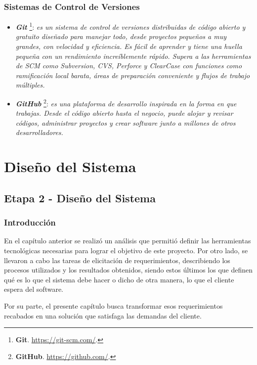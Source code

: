 \documentclass[11pt,oneside]{book}
\begin{document}
\subsection{Sistemas de Control de Versiones}
\begin{itemize}
\item \textit{\textbf{Git}} \footnote{\textbf{Git}. \url{https://git-scm.com/}.}: \textit{es un sistema de control de versiones distribuidas de código abierto y gratuito diseñado para manejar todo, desde proyectos pequeños a muy grandes, con velocidad y eficiencia. Es fácil de aprender y tiene una huella pequeña con un rendimiento increíblemente rápido. Supera a las herramientas de SCM como Subversion, CVS, Perforce y ClearCase con funciones como ramificación local barata, áreas de preparación conveniente y flujos de trabajo múltiples.}

\item \textit{\textbf{GitHub}} \footnote{\textbf{GitHub}. \url{https://github.com/}.}: \textit{es una plataforma de desarrollo inspirada en la forma en que trabajas. Desde el código abierto hasta el negocio, puede alojar y revisar códigos, administrar proyectos y crear software junto a millones de otros desarrolladores.}
\end{itemize}

\clearpage
\newpage
\chapter{Diseño del Sistema} \label{cap2}
\section{Etapa 2 - Diseño del Sistema}

\subsection{Introducción}
En el capítulo anterior se realizó un análisis que permitió definir las herramientas tecnológicas necesarias para lograr el objetivo de este proyecto. Por otro lado, se llevaron a cabo las tareas de elicitación de requerimientos, describiendo los procesos utilizados y los resultados obtenidos, siendo estos últimos los que definen qué es lo que el sistema debe hacer o dicho de otra manera, lo que el cliente espera del software. 

Por su parte, el presente capítulo busca transformar esos requerimientos recabados en una solución que satisfaga las demandas del cliente.
\end{document}
